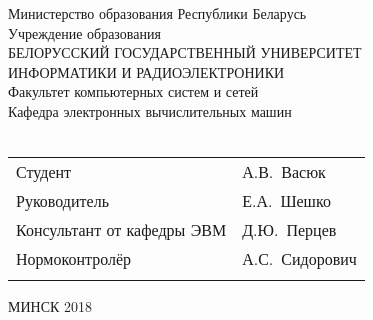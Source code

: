 \begin{titlepage}
  \begin{center}
    Министерство образования Республики Беларусь\\[1em]
    Учреждение образования\\
    БЕЛОРУССКИЙ ГОСУДАРСТВЕННЫЙ УНИВЕРСИТЕТ \\
    ИНФОРМАТИКИ И РАДИОЭЛЕКТРОНИКИ\\[1em]

    Факультет компьютерных систем и сетей \\[0.6cm]

    Кафедра электронных вычислительных машин \\[2.5cm]


        {} \\[4cm]

        \noindent
        \begin{tabular}{ p{}p{} }
          Студент & А.В.~Васюк \\[1em]

          Руководитель & Е.А.~Шешко \\[1em]

          Консультант от кафедры ЭВМ & Д.Ю.~Перцев \\[1em]


          Нормоконтролёр & А.С.~Сидорович\\[1em]
          & \\

        \end{tabular}

        \vfill

        {\normalsize МИНСК 2018}
    \end{center}

\end{titlepage}
